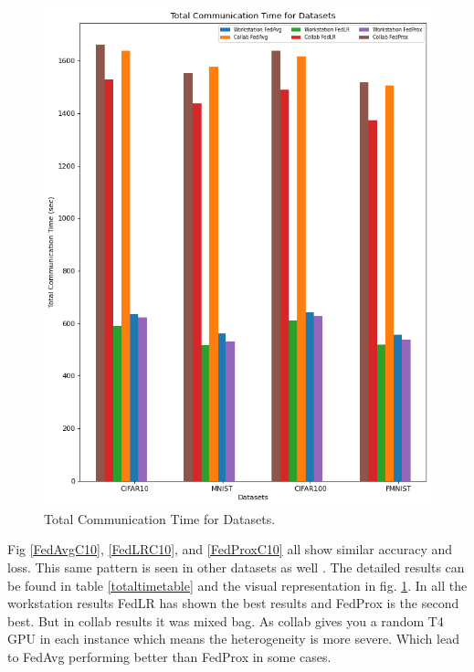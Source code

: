 \documentclass[conference]{IEEEtran}
\begin{document}
\begin{figure}[htp!]
	\centering
	\includegraphics[scale=.36]{Images/Result Images/FinalGraphwithFedprox }
	\caption{Total Communication Time for Datasets.}
	\label{Finalgraph}
\end{figure}


Fig \ref{FedAvgC10}, \ref{FedLRC10}, and \ref{FedProxC10} all show similar accuracy and loss. This same pattern is seen in other datasets as well \cite{lecun1998mnist}  \cite{xiao2017fashionmnistnovelimagedataset} \cite{Krizhevsky09learningmultiple}. The detailed results can be found in table \ref{totaltimetable} and the visual representation in fig. \ref{Finalgraph}. In all the workstation results FedLR has shown the best results and FedProx is the second best. But in collab results it was mixed bag. As collab gives you a random T4 GPU in each instance which means the heterogeneity is more severe. Which lead to FedAvg performing better than FedProx in some cases.
\end{document}
